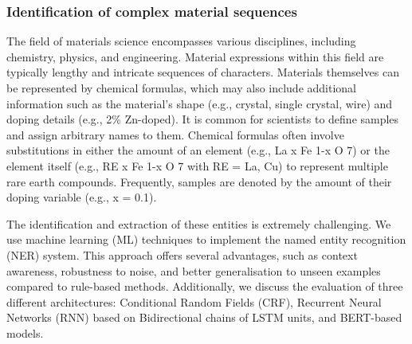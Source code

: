 \subsubsection{Identification of complex material sequences}
\label{sec:intro-ner-materials}
The field of materials science encompasses various disciplines, including chemistry, physics, and engineering. 
Material expressions within this field are typically lengthy and intricate sequences of characters. Materials themselves can be represented by chemical formulas, which may also include additional information such as the material's shape (e.g., crystal, single crystal, wire) and doping details (e.g., 2\% Zn-doped). It is common for scientists to define samples and assign arbitrary names to them. Chemical formulas often involve substitutions in either the amount of an element (e.g., La x Fe 1-x O 7) or the element itself (e.g., RE x Fe 1-x O 7 with RE = La, Cu) to represent multiple rare earth compounds. Frequently, samples are denoted by the amount of their doping variable (e.g., x = 0.1).

The identification and extraction of these entities is extremely challenging. 
We use machine learning (ML) techniques to implement the named entity recognition (NER) system. This approach offers several advantages, such as context awareness, robustness to noise, and better generalisation to unseen examples compared to rule-based methods. Additionally, we discuss the evaluation of three different architectures: Conditional Random Fields (CRF), Recurrent Neural Networks (RNN) based on Bidirectional chains of LSTM units, and BERT-based models.

